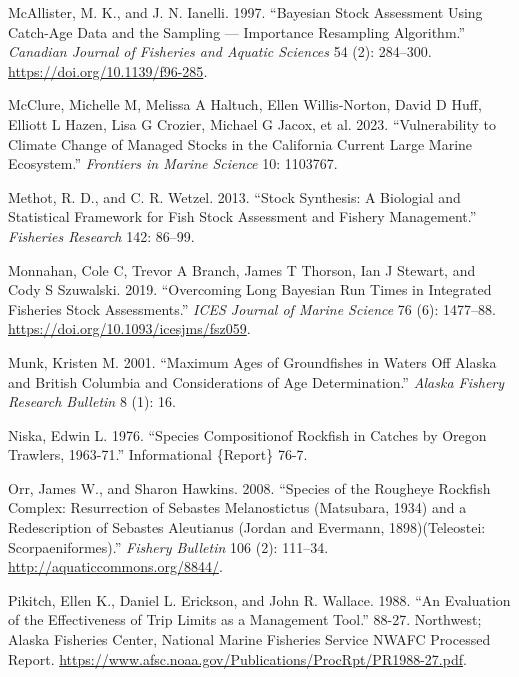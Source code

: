 \documentclass[
]{scrartcl}
\newlength{\cslhangindent}
\newenvironment{CSLReferences}[2] %
 {\begin{list}{}{%
  \setlength{\itemindent}{0pt}
  \setlength{\leftmargin}{0pt}
  \setlength{\parsep}{0pt}
  \ifodd #1
   \setlength{\leftmargin}{\cslhangindent}
   \setlength{\itemindent}{-1\cslhangindent}
  \fi
  \setlength{\itemsep}{#2\baselineskip}}}
 {\end{list}}
\begin{document}
\begin{CSLReferences}{1}{0}
McAllister, M. K., and J. N. Ianelli. 1997. {``Bayesian Stock Assessment
Using Catch-Age Data and the Sampling --- Importance Resampling
Algorithm.''} \emph{Canadian Journal of Fisheries and Aquatic Sciences}
54 (2): 284--300. \url{https://doi.org/10.1139/f96-285}.

McClure, Michelle M, Melissa A Haltuch, Ellen Willis-Norton, David D
Huff, Elliott L Hazen, Lisa G Crozier, Michael G Jacox, et al. 2023.
{``Vulnerability to Climate Change of Managed Stocks in the California
Current Large Marine Ecosystem.''} \emph{Frontiers in Marine Science}
10: 1103767.

Methot, R. D., and C. R. Wetzel. 2013. {``Stock Synthesis: A Biologial
and Statistical Framework for Fish Stock Assessment and Fishery
Management.''} \emph{Fisheries Research} 142: 86--99.

Monnahan, Cole C, Trevor A Branch, James T Thorson, Ian J Stewart, and
Cody S Szuwalski. 2019. {``Overcoming Long Bayesian Run Times in
Integrated Fisheries Stock Assessments.''} \emph{{ICES} Journal of
Marine Science} 76 (6): 1477--88.
\url{https://doi.org/10.1093/icesjms/fsz059}.

Munk, Kristen M. 2001. {``Maximum {Ages} of {Groundfishes} in {Waters}
Off {Alaska} and {British Columbia} and {Considerations} of {Age
Determination}.''} \emph{Alaska Fishery Research Bulletin} 8 (1): 16.

Niska, Edwin L. 1976. {``Species {Compositionof} Rockfish in Catches by
{Oregon} {Trawlers}, 1963-71.''} Informational \{Report\} 76-7.

Orr, James W., and Sharon Hawkins. 2008. {``Species of the Rougheye
Rockfish Complex: Resurrection of {Sebastes} Melanostictus ({Matsubara},
1934) and a Redescription of {Sebastes} Aleutianus ({Jordan} and
{Evermann}, 1898)({Teleostei}: {Scorpaeniformes}).''} \emph{Fishery
Bulletin} 106 (2): 111--34. \url{http://aquaticcommons.org/8844/}.

Pikitch, Ellen K., Daniel L. Erickson, and John R. Wallace. 1988. {``An
Evaluation of the Effectiveness of Trip Limits as a Management Tool.''}
88-27. Northwest; Alaska Fisheries Center, National Marine Fisheries
Service NWAFC Processed Report.
\url{https://www.afsc.noaa.gov/Publications/ProcRpt/PR1988-27.pdf}.


\end{CSLReferences}
\end{document}
